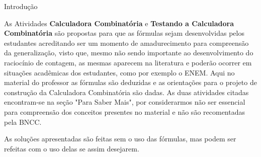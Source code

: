 \begin{apresentacao}{Introdução}
 
 As  Atividades \textbf{Calculadora Combinatória} e \textbf{Testando a Calculadora Combinatória} são propostas para que as fórmulas sejam desenvolvidas pelos estudantes acreditando ser um momento de amadurecimento para compreensão da generalização, visto que, mesmo não sendo importante ao desenvolvimento do raciocínio de contagem, as mesmas aparecem na literatura e poderão ocorrer em situações acadêmicas dos estudantes, como por exemplo o ENEM.  Aqui no material do professor as fórmulas são deduzidas e as orientações para o projeto de construção da Calculadora Combinatória são dadas. As duas atividades citadas encontram-se na seção "Para Saber Mais", por considerarmos não ser essencial para compreensão dos conceitos presentes no material e não são recomentadas pela BNCC.

As soluções apresentadas são feitas sem o uso das fórmulas, mas podem ser refeitas com o uso delas se assim desejarem. 

\end{apresentacao}


\def\currentcolor{session1}

